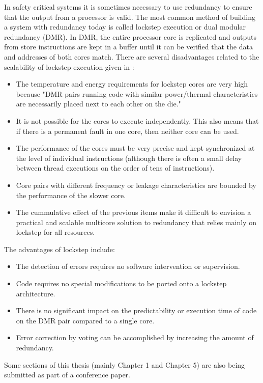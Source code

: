 In safety critical systems it is sometimes necessary to use redundancy to ensure that the output from a processor is valid. The most common method of building a system with redundancy today is called lockstep execution or dual modular redundancy (DMR). In DMR, the entire processor core is replicated and outputs from store instructions are kept in a buffer until it can be verified that the data and addresses of both cores match. There are several disadvantages related to the scalability of lockstep execution given in \cite{lafrieda2007utilizing}:
\begin{itemize}
\item The temperature and energy requirements for lockstep cores are very high because "DMR pairs running code with similar power/thermal characteristics are necessarily placed next to each other on the die."
\item It is not possible for the cores to execute independently. This also means that if there is a permanent fault in one core, then neither core can be used.
\item The performance of the cores must be very precise and kept synchronized at the level of individual instructions (although there is often a small delay between thread executions on the order of tens of instructions).
\item Core pairs with different frequency or leakage characteristics are bounded by the performance of the slower core.
\item The cummulative effect of the previous items make it difficult to envision a practical and scalable multicore solution to redundancy that relies mainly on lockstep for all resources.
\end{itemize}
The advantages of lockstep include:
\begin{itemize}
\item The detection of errors requires no software intervention or supervision.
\item Code requires no special modifications to be ported onto a lockstep architecture.
\item There is no significant impact on the predictability or execution time of code on the DMR pair compared to a single core.
\item Error correction by voting can be accomplished by increasing the amount of redundancy.
\end{itemize}

Some sections of this thesis (mainly Chapter 1 and Chapter 5) are also being submitted as part of a conference paper.

